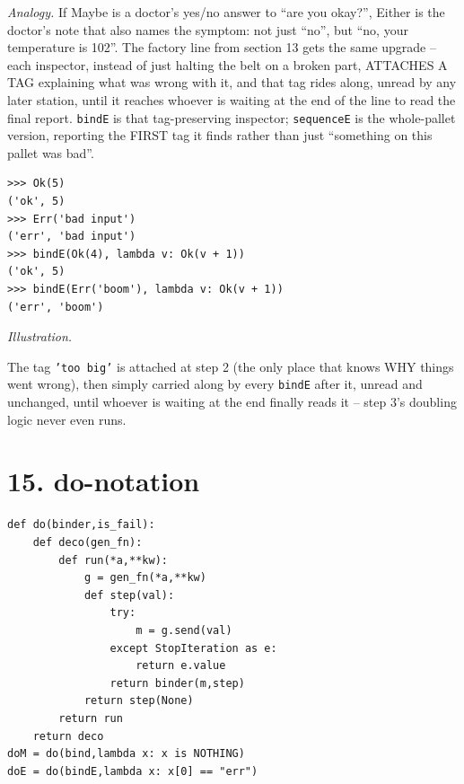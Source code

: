 \documentclass[10pt,letterpaper]{book}
\begin{document}
\textit{Analogy.} If Maybe is a doctor's yes/no answer to ``are you okay?'', Either is the doctor's
note that also names the symptom: not just ``no'', but ``no, your temperature is 102''. The factory
line from section 13 gets the same upgrade -- each inspector, instead of just halting the belt on a
broken part, ATTACHES A TAG explaining what was wrong with it, and that tag rides along, unread by
any later station, until it reaches whoever is waiting at the end of the line to read the final
report. \texttt{bindE} is that tag-preserving inspector; \texttt{sequenceE} is the whole-pallet
version, reporting the FIRST tag it finds rather than just ``something on this pallet was bad''.
\begin{lstlisting}[style=ex]
>>> Ok(5)
('ok', 5)
>>> Err('bad input')
('err', 'bad input')
>>> bindE(Ok(4), lambda v: Ok(v + 1))
('ok', 5)
>>> bindE(Err('boom'), lambda v: Ok(v + 1))
('err', 'boom')
\end{lstlisting}
\noindent\textit{Illustration.}
\begin{center}
\end{center}
The tag \texttt{'too big'} is attached at step 2 (the only place that knows WHY things went wrong),
then simply carried along by every \texttt{bindE} after it, unread and unchanged, until whoever is
waiting at the end finally reads it -- step 3's doubling logic never even runs.
\section*{15. do-notation}
\begin{lstlisting}[style=code]
def do(binder,is_fail):
    def deco(gen_fn):
        def run(*a,**kw):
            g = gen_fn(*a,**kw)
            def step(val):
                try:
                    m = g.send(val)
                except StopIteration as e:
                    return e.value
                return binder(m,step)
            return step(None)
        return run
    return deco
doM = do(bind,lambda x: x is NOTHING)
doE = do(bindE,lambda x: x[0] == "err")
\end{lstlisting}
\end{document}
